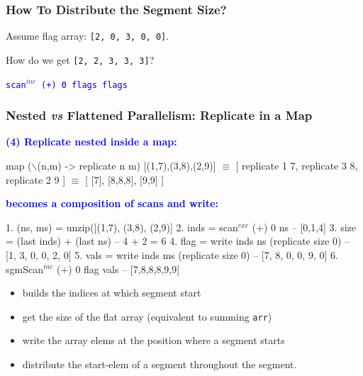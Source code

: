 \documentclass{beamer}
\newcommand{\blue}[1]{\textcolor{Blue}{{#1}}}
\renewcommand{\emph}[1]{\textcolor{structure}{#1}}
\newcommand{\emp}[1]{\textcolor{DikuRed}{ #1}}
\newcommand{\mymath}[1]{$ #1 $}
\newcommand{\myindu}[1]{^{#1}}
\begin{document}
\begin{frame}[fragile,t]
  \frametitle{How To Distribute the Segment Size?}

Assume flag array: \emph{\tt [2, 0, 3, 0, 0]}.

\bigskip

How do we get \emp{\tt [2, 2, 3, 3, 3]}?

\bigskip
\pause

\blue{\tt scan\mymath{\myindu{inc}} (+) 0 flags flags}

\end{frame}


\begin{frame}[fragile,t]
  \frametitle{Nested {\it vs} Flattened Parallelism: Replicate in a Map}

\blue{\bf (4) Replicate nested inside a map:}

\begin{colorcode}[fontsize=\scriptsize]
map (\mymath{\backslash}(n,m) -> replicate n m) \emp{[(1,7),(3,8),(2,9)]} \mymath{\equiv}
[ replicate 1 7, replicate 3 8, replicate 2 9 ] \mymath{\equiv}
[ [7], [8,8,8], [9,9] ]
\end{colorcode}

\bigskip
\pause

\blue{\bf becomes a composition of scans and write:}
\bigskip

\begin{colorcode}[fontsize=\scriptsize]
1. (ns, ms)  = unzip([(1,7), (3,8), (2,9)]
2. inds = scan\mymath{\myindu{exc}} (+) 0 ns                       -- [0,1,4]
3. size = (last inds) + (last ns)               -- 4 + 2 = 6
4. flag = write inds  ns  (replicate size 0)    -- [1, 3, 0, 0, 2, 0]
5. vals = write inds  ms  (replicate size 0)    -- [7, 8, 0, 0, 9, 0]
6. sgmScan\mymath{\myindu{inc}} (+) 0 flag \emp{vals}                    \emph{-- [7,8,8,8,9,9]}
\end{colorcode}

\bigskip

\begin{itemize}
    \item[2.] builds the indices at which segment start
    \item[3.] get the size of the flat array (equivalent to summing {\tt arr})
    \item[4-5.] write the array elems at the position where a segment starts
    \item[6.] distribute the start-elem of a segment throughout the segment.  
\end{itemize}

\end{frame}
\end{document}
